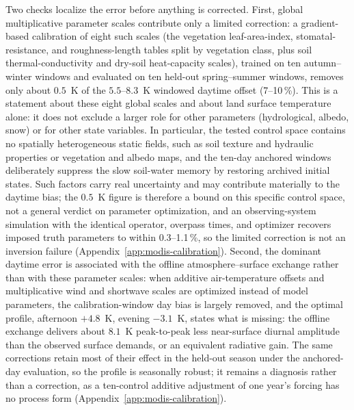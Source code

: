 Two checks localize the error before anything is corrected. First, global
multiplicative parameter scales contribute only a limited correction: a
gradient-based calibration of eight such scales (the vegetation
leaf-area-index, stomatal-resistance, and roughness-length tables split by
vegetation class, plus soil thermal-conductivity and dry-soil heat-capacity
scales), trained on ten autumn--winter windows and evaluated on ten
held-out spring--summer windows, removes only about $0.5$~K of the
$5.5$--$8.3$~K windowed daytime offset (7--10\,\%). This is a statement
about these eight global scales and about land surface temperature alone:
it does not exclude a larger role for other parameters (hydrological,
albedo, snow) or for other state variables. In particular, the tested
control space contains no spatially heterogeneous static fields, such as
soil texture and hydraulic properties or vegetation and albedo maps, and
the ten-day anchored windows deliberately suppress the slow soil-water
memory by restoring archived initial states. Such factors carry real
uncertainty and may contribute materially to the daytime bias; the $0.5$~K
figure is therefore a bound on this specific control space, not a general
verdict on parameter optimization, and an observing-system
simulation with the identical operator, overpass times, and optimizer
recovers imposed truth parameters to within 0.3--1.1\,\%, so the limited
correction is not an inversion failure (Appendix~\ref{app:modis-calibration}).
Second, the dominant daytime error is associated with the
offline atmosphere--surface exchange rather than with these parameter
scales: when additive air-temperature offsets and multiplicative wind and
shortwave scales are optimized instead of model parameters, the
calibration-window day bias is largely removed, and the optimal profile,
afternoon $+4.8$~K, evening $-3.1$~K, states
what is missing: the offline exchange delivers about $8.1$~K peak-to-peak
less near-surface diurnal amplitude than the observed surface demands, or an
equivalent radiative gain. The same corrections retain most of their
effect in the held-out season under the anchored-day evaluation, so the
profile is seasonally robust; it remains a diagnosis rather than a
correction, as a ten-control additive adjustment of one year's forcing has
no process form
(Appendix~\ref{app:modis-calibration}).

